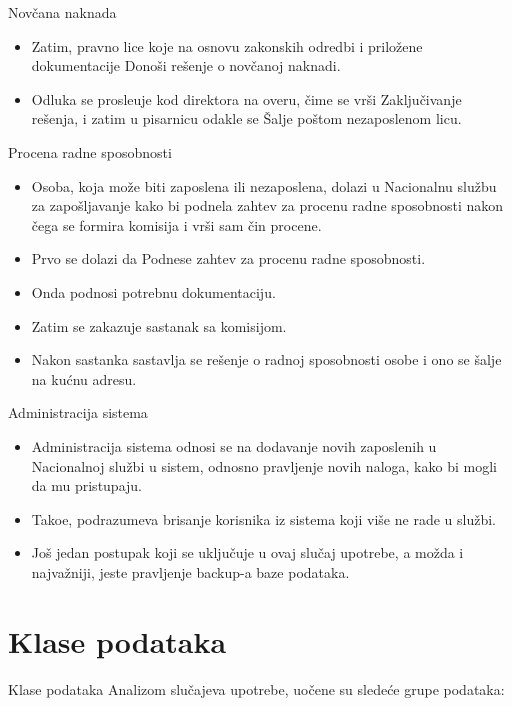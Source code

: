 \documentclass[11pt]{beamer}
\begin{document}
\begin{frame}{Nov\v cana naknada}
\begin{itemize}		
		\item Zatim, pravno lice koje na osnovu zakonskih odredbi i prilo\v zene dokumentacije Dono\v si re\v senje o nov\v canoj naknadi.
		\item Odluka se prosle\dj uje kod direktora na overu, \v cime se vr\v si Zaklju\v civanje re\v senja, i zatim u pisarnicu odakle se \v Salje po\v stom nezaposlenom licu.
	\end{itemize}
\end{frame}

\begin{frame}{Procena radne sposobnosti}
	\begin{itemize}
		\item Osoba, koja mo\v ze biti zaposlena ili nezaposlena, dolazi u Nacionalnu slu\v zbu za zapo\v sljavanje kako bi podnela zahtev za procenu radne sposobnosti nakon \v cega se formira komisija i vr\v si sam \v cin procene.
		\item Prvo se dolazi da Podnese zahtev za procenu radne sposobnosti.
		\item Onda podnosi potrebnu dokumentaciju.
		\item Zatim se zakazuje sastanak sa komisijom.
		\item Nakon sastanka sastavlja se re\v senje o radnoj sposobnosti osobe i ono se \v salje na ku\' cnu adresu. 
	\end{itemize}
\end{frame}

\begin{frame}{Administracija sistema}
	\begin{itemize}
		\item Administracija sistema odnosi se na dodavanje novih zaposlenih u Nacionalnoj slu\v zbi u sistem, odnosno pravljenje novih naloga, kako bi mogli da mu pristupaju. 
		\item Tako\dj e, podrazumeva brisanje korisnika iz sistema koji vi\v se ne rade u slu\v zbi. 
		\item Jo\v s jedan postupak koji se uklju\v cuje u ovaj slu\v caj upotrebe, a mo\v zda i najva\v zniji, jeste pravljenje backup-a baze podataka.
	\end{itemize}
\end{frame}

\section{Klase podataka}
\begin{frame}{Klase podataka}
	Analizom slu\v cajeva upotrebe, uo\v cene su slede\' ce grupe podataka:
\end{frame}
\end{document}
